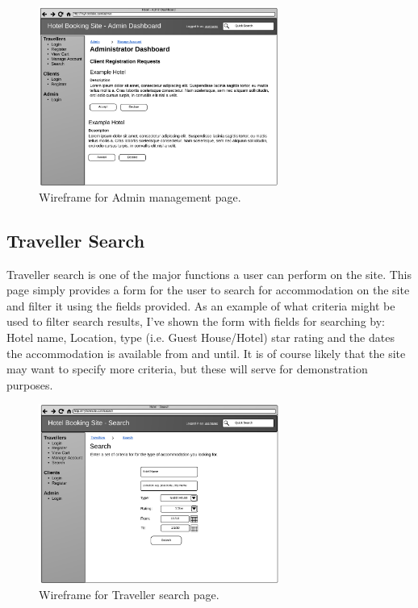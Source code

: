 \documentclass{article}
\begin{document}
\begin{figure}[H]
\centering
\includegraphics[width=0.7\textwidth]{img/wireframes/Administrator.png}
\caption{Wireframe for Admin management page.}
\label{fig:wireframe-client-register}
\end{figure}


\subsection{Traveller Search}
Traveller search is one of the major functions a user can perform on the site. This page simply provides a form for the user to search for accommodation on the site and filter it using the fields provided. As an example of what criteria might be used to filter search results, I've shown the form with fields for searching by: Hotel name, Location, type (i.e. Guest House/Hotel) star rating and the dates the accommodation is available from and until. It is of course likely that the site may want to specify more criteria, but these will serve for demonstration purposes.

\begin{figure}[H]
\centering
\includegraphics[width=0.7\textwidth]{img/wireframes/Search.png}
\caption{Wireframe for Traveller search page.}
\label{fig:wireframe-traveller-search}
\end{figure}
\end{document}
